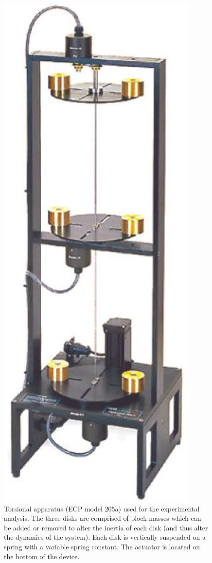 \documentclass[a4paper, 10pt, conference]{ieeeconf}
\begin{document}
\begin{figure}
\centering
\includegraphics[scale=0.2]{pics/torsional_pic}
\caption{Torsional apparatus (ECP model 205a) used for the experimental analysis. The three disks are comprised of block masses which can be added or removed to alter the inertia of each disk (and thus alter the dynamics of the system). Each disk is vertically suspended on a spring with a variable spring constant. The actuator is located on the bottom of the device.}
\label{fig:torsional}
\end{figure}
\end{document}
